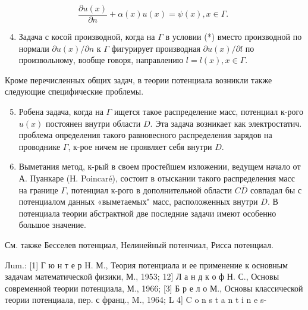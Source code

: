 \documentclass[10pt]{article}
\begin{document}
\[

\frac{\partial u(x)}{\partial n}+\alpha(x) u(x)=\psi(x), x \in \Gamma \text {. }

\]



\begin{enumerate}

  \setcounter{enumi}{3}

  \item Задача с косой производной, когда на $\Gamma$ в условии (*) вместо производной по нормали $\partial u(x) / \partial n$ к $\Gamma$ фигурирует производная $\partial u(x) / \partial l$ по произвольному, вообще говоря, направлению $l=l(x), x \in \Gamma$.

\end{enumerate}



Кроме перечисленных общих задач, в теории потенциала возникли также следующие специфические проблемы.



\begin{enumerate}

  \setcounter{enumi}{4}

  \item Робена задача, когда на $\Gamma$ ищется такое распределение масс, потенциал к-рого $u(x)$ постоянен внутри области $D$. Эта задача возникает как электростатич. проблема определения такого равновесного распределения зарядов на проводнике $\Gamma$, к-рое ничем не проявляет себя внутри $D$.



  \item Выметания метод, к-рый в своем простейшем изложении, ведущем начало от А. Пуанкаре (Н. Poincaré), состоит в отыскании такого распределения масс на границе $\Gamma$, потенциал к-рого в дополнительной области $C \bar{D}$ совпадал бы с потенциалом данных «выметаемых" масс, расположенных внутри $D$. В потенциала теории абстрактной две последние задачи имеют особенно большое значение.



\end{enumerate}



См. также Бесселев потенциал, Нелинейный потенчиал, Рисса потенциал.



Лum.: [1] Г ю н т е р H. М., Теория потенциала и ее применение к основным задачам математической физики, М., 1953; 12] Л а н д к о ф Н. С., Основы современной теории потенциала, М., 1966; [3] Б р е л о М., Основы классической теории потенциала, пеp. с франц., M., 1964; L 4] C o n s t a n t i n e s-
\end{document}
